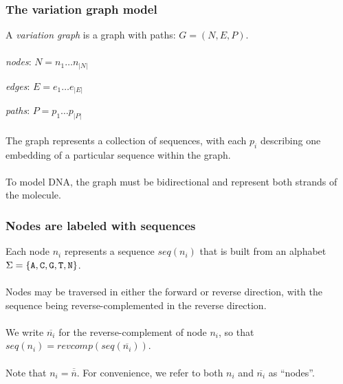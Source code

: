 \documentclass{beamer}
\begin{document}
\begin{frame}
  \frametitle{The variation graph model}
  A \emph{variation graph} is a graph with paths: $G = (N, E, P)$.
\\~\\  
  \emph{nodes}: $N = n_1 \ldots n_{|N|}$
  
  \emph{edges}: $E = e_1 \ldots e_{|E|}$

  \emph{paths}: $P = p_1 \ldots p_{|P|}$
  \\~\\
  The graph represents a collection of sequences, with each $p_i$ describing one embedding of a particular sequence within the graph.
  \\~\\
  To model DNA, the graph must be bidirectional and represent both strands of the molecule.
\end{frame}

\begin{frame}
  \frametitle{Nodes are labeled with sequences}
  Each node $n_i$ represents a sequence $seq(n_i)$ that is built from an alphabet $\Sigma = \{ {\tt A, C, G, T, N} \}$.
  \\~\\
  Nodes may be traversed in either the forward or reverse direction, with the sequence being reverse-complemented in the reverse direction.
  \\~\\
  We write $\overline{n_i}$ for the reverse-complement of node $n_i$, so that $seq(n_i) = revcomp(seq(\overline{n_i}))$.
  \\~\\
  Note that $n_i = \overline{\overline{n}}$. For convenience, we refer to both $n_i$ and $\overline{n_i}$ as ``nodes''.
\end{frame}
\end{document}
